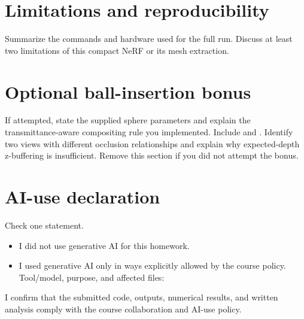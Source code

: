 \documentclass[11pt]{article}
\begin{document}
\section{Limitations and reproducibility}
Summarize the commands and hardware used for the full run. Discuss at least
two limitations of this compact NeRF or its mesh extraction.

\section*{Optional ball-insertion bonus}
If attempted, state the supplied sphere parameters and explain the
transmittance-aware compositing rule you implemented. Include
 and
. Identify two views with different occlusion
relationships and explain why expected-depth z-buffering is insufficient.
Remove this section if you did not attempt the bonus.

\section*{AI-use declaration}
Check one statement.

\begin{itemize}
  \item[$\square$] I did not use generative AI for this homework.
  \item[$\square$] I used generative AI only in ways explicitly allowed by
  the course policy. Tool/model, purpose, and affected files:
  \underline{\hspace{1.6in}}
\end{itemize}

I confirm that the submitted code, outputs, numerical results, and written
analysis comply with the course collaboration and AI-use policy.
\end{document}

